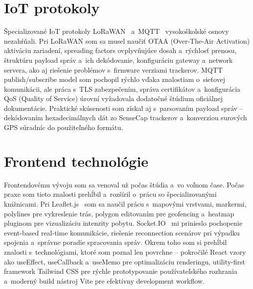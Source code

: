 \section{IoT protokoly}
\label{sec:ChybProtokoly}

Špecializované IoT protokoly LoRaWAN~\cite{lorawan_spec} a~MQTT~\cite{mqtt_spec} vysokoškolské osnovy nezahŕňali. Pri LoRaWAN som sa musel naučiť OTAA (Over-The-Air Activation) aktiváciu zariadení, spreading factors ovplyvňujúce dosah a~rýchlosť prenosu, štruktúru payload správ a~ich dekódovanie, konfiguráciu gateway a~network servera, ako aj riešenie problémov s~firmware verziami trackerov. MQTT publish/subscribe model som pochopil rýchlo vďaka znalostiam o~sieťovej komunikácii, ale práca s~TLS zabezpečením, správa certifikátov a~konfigurácia QoS (Quality of Service) úrovní vyžadovala dodatočné štúdium oficiálnej dokumentácie. Praktické skúsenosti som získal aj s~parsovaním payload správ -- dekódovaním hexadecimálnych dát zo SenseCap trackerov a~konverziou surových GPS súradníc do použiteľného formátu.

\section{Frontend technológie}
\label{sec:ChybFrontend}

Frontendovému vývoju som sa venoval už počas štúdia a~vo voľnom čase. Počas praxe som tieto znalosti prehĺbil a~rozšíril o~prácu so špecializovanými knižnicami. Pri Leaflet.js~\cite{leaflet_docs} som sa naučil prácu s~mapovými vrstvami, markermi, polylines pre vykreslenie trás, polygon editovaním pre geofencing a~heatmap pluginom pre vizualizáciu intenzity pobytu. Socket.IO~\cite{socketio_docs} mi prinieslo pochopenie event-based real-time komunikácie, riešenie reconnection scenárov pri výpadku spojenia a~správne poradie spracovania správ. Okrem toho som si prehĺbil znalosti s~technológiami, ktoré som poznal len povrchne -- pokročilé React vzory ako useEffect, useCallback a~useMemo pre optimalizáciu renderingu, utility-first framework Tailwind CSS pre rýchle prototypovanie používateľského rozhrania a~moderný build nástroj Vite pre efektívny development workflow.

\endinput

